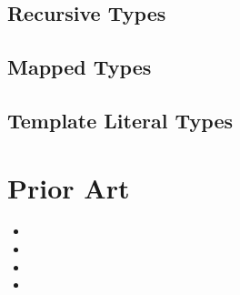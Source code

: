 \subsection{Recursive Types}
\subsection{Mapped Types}
\subsection{Template Literal Types}

\section{Prior Art}

\begin{itemize}
  \item {}
  \item {}
  \item {}
  \item {}
\end{itemize}
